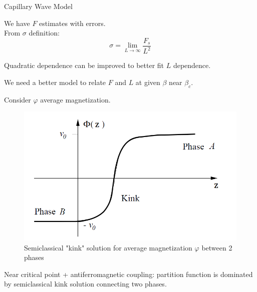 \documentclass[12pt,handout]{beamer}
\begin{document}
\begin{frame}{Capillary Wave Model}
\begin{center}
We have $F$ estimates with errors.\\
\vspace{10pt}
From $\sigma$ definition:
\[
	\sigma = \lim_{L \rightarrow \infty} \frac{F_s}{L^2}
\]

Quadratic dependence can be improved to better fit $L$ dependence.\\
\vspace{10pt}

We need a better model to relate $F$ and $L$ at given $\beta$ near $\beta_c$.

\end{center}
\end{frame}


\begin{frame}
\begin{center}
Consider $\varphi$ average magnetization.
\begin{figure}
\centering
\includegraphics[scale=0.30, center]{kink.png}
\caption{\centering Semiclassical "kink" solution for average magnetization $\varphi$ between 2 phases 
\label{fig:kink}}
\end{figure}
Near critical point + antiferromagnetic coupling: partition function is dominated by semiclassical kink solution connecting two phases.\\
\end{center}
\end{frame}
\end{document}
